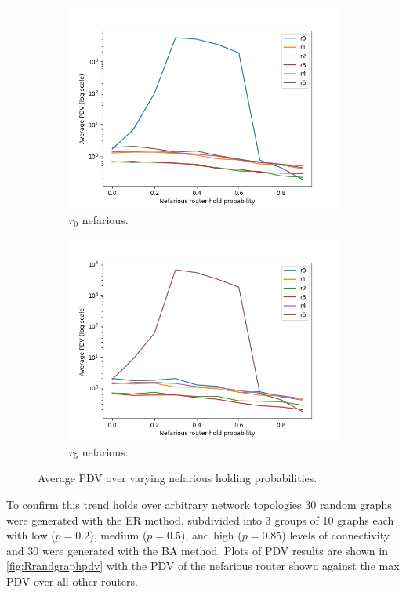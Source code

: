\begin{figure}[H]
\begin{subfigure}{0.475\textwidth}
        \includegraphics[width=\textwidth]{figs/results/0_nef.png}
        \caption[]{$r_0$ nefarious.}
    \end{subfigure}
    \begin{subfigure}{0.475\textwidth}
        \includegraphics[width=\textwidth]{figs/results/5_nef.png}
        \caption[]{$r_5$ nefarious.}
    \end{subfigure}
    \caption[Results of router level PDV over varying hold probabilities.]{Average PDV over varying nefarious holding probabilities.}
    \label{fig:MrouterPDV}
\end{figure}

To confirm this trend holds over arbitrary network topologies 30 random graphs were generated with the ER method, subdivided into 3 groups of 10 graphs each with low ($p=0.2$), medium ($p=0.5$), and high ($p=0.85$) levels of connectivity and 30 were generated with the BA method. Plots of PDV results are shown in \cref{fig:Rrandgraphpdv} with the PDV of the nefarious router shown against the max PDV over all other routers.

